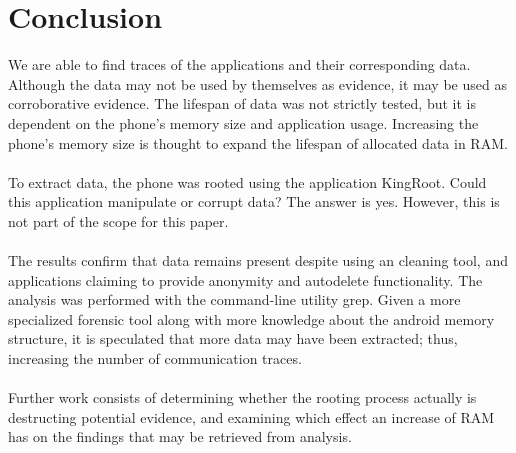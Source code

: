 \section{Conclusion}
We are able to find traces of the applications and their corresponding data. Although the data may not be used by themselves as evidence, it may be used as corroborative evidence. The lifespan of data was not strictly tested, but it is dependent on the phone's memory size and application usage. Increasing the phone's memory size is thought to expand the lifespan of allocated data in RAM.\\\\
To extract data, the phone was rooted using the application KingRoot. Could this application manipulate or corrupt data? The answer is yes. However, this is not part of the scope for this paper.\\\\
The results confirm that data remains present despite using an cleaning tool, and applications claiming to provide anonymity and autodelete functionality. The analysis was performed with the command-line utility grep. Given a more specialized forensic tool along with more knowledge about the android memory structure, it is speculated that more data may have been extracted; thus, increasing the number of communication traces.\\\\
Further work consists of determining whether the rooting process actually is destructing potential evidence, and examining which effect an increase of RAM has on the findings that may be retrieved from analysis.